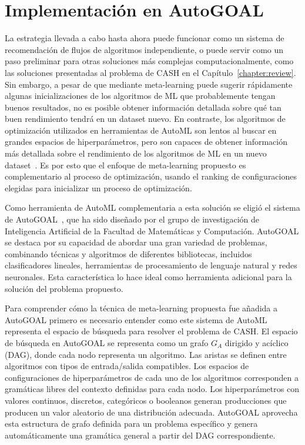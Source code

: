 \section{Implementación en AutoGOAL}\label{sec:autogoal_imp}


La estrategia llevada a cabo hasta ahora puede funcionar como un sistema de recomendación de flujos de algoritmos independiente, o puede servir como un paso preliminar para otras soluciones más complejas computacionalmente, como las soluciones presentadas al problema de CASH en el Capítulo~\ref{chapter:review}. Sin embargo, a pesar de que mediante meta-learning puede sugerir rápidamente algunas inicializaciones de los algoritmos de ML que probablemente tengan buenos resultados, no es posible obtener información detallada sobre qué tan buen rendimiento tendrá en un dataset nuevo. En contraste, los algoritmos de optimización utilizados en herramientas de AutoML son lentos al buscar en grandes espacios de hiperparámetros, pero son capaces de obtener información más detallada sobre el rendimiento de los algoritmos de ML en un nuevo dataset~\cite{fuerer2015efficient}. Es por esto que el enfoque de meta-learning propuesto es complementario al proceso de optimización, usando el ranking de configuraciones elegidas para inicializar un proceso de optimización.

Como herramienta de AutoML complementaria a esta solución se eligió el sistema de AutoGOAL~\cite{autogoal}, que ha sido diseñado por el grupo de investigación de Inteligencia Artificial de la Facultad de Matemáticas y Computación. AutoGOAL se destaca por su capacidad de abordar una gran variedad de problemas, combinando técnicas y algoritmos de diferentes bibliotecas, incluidos clasificadores lineales, herramientas de procesamiento de lenguaje natural y redes neuronales. Esta característica lo hace ideal como herramienta adicional para la solución del problema propuesto.

Para comprender cómo la técnica de meta-learning propuesta fue añadida a AutoGOAL primero es necesario entender como este sistema de AutoML representa el espacio de búsqueda para resolver el problema de CASH. El espacio de búsqueda en AutoGOAL se representa como un grafo $G_A$ dirigido y acíclico (DAG), donde cada nodo representa un algoritmo. Las aristas se definen entre algoritmos con tipos de entrada/salida compatibles. Los espacios de configuraciones de hiperparámetros de cada uno de los algoritmos corresponden a gramáticas libres del contexto definidas para cada nodo. Los hiperparámetros con valores continuos, discretos, categóricos o booleanos generan producciones que producen un valor aleatorio de una distribución adecuada. AutoGOAL aprovecha esta estructura de grafo definida para un problema específico y genera automáticamente una gramática general a partir del DAG correspondiente.

